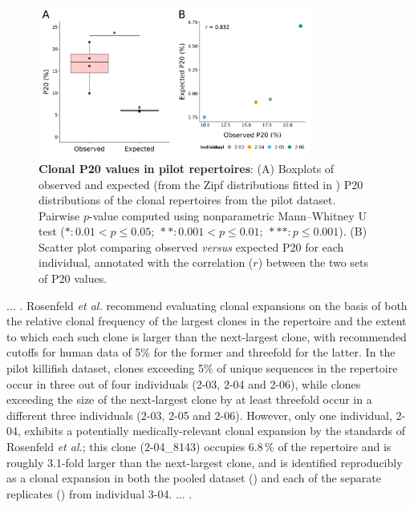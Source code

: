 \begin{figure}
\centering
\includegraphics[width=0.8\textwidth]{_Figures/png/pilot-clones-zipf-p20-obs-exp}
\caption[Clonal P20 values in \Nfu pilot repertoires]{\textbf{Clonal P20 values in \Nfu pilot repertoires}: (A) Boxplots of observed and expected (from the Zipf distributions fitted in ) P20 distributions of the clonal repertoires from the pilot \igseq dataset. Pairwise $p$-value computed using nonparametric Mann–Whitney U test ($*: 0.01 < p \leq 0.05;~**: 0.001 < p \leq 0.01;~***: p \leq 0.001$). (B) Scatter plot comparing observed \textit{versus} expected P20 for each individual, annotated with the correlation ($r$) between the two sets of P20 values.}
\label{fig:igseq-pilot-clones-zipf-p20}
\end{figure}

... . %
Rosenfeld \textit{et al.} \parencite{rosenfeld2018clonesize} recommend evaluating clonal expansions on the basis of both the relative clonal frequency of the largest clones in the repertoire and the extent to which each such clone is larger than the next-largest clone, with recommended cutoffs for human data of 5\% for the former and threefold for the latter. In the pilot killifish dataset, clones exceeding 5\% of unique sequences in the repertoire occur in three out of four individuals (2-03, 2-04 and 2-06), while clones exceeding the size of the next-largest clone by at least threefold occur in a different three individuals (2-03, 2-05 and 2-06). However, only one individual, 2-04, exhibits a potentially medically-relevant clonal expansion by the standards of Rosenfeld \textit{et al.}; this clone (2-04\_8143) occupies 6.8\,\% of the repertoire and is roughly 3.1-fold larger than the next-largest clone, and is identified reproducibly as a clonal expansion in both the pooled dataset () and each of the separate replicates () from individual 3-04.
... . %


